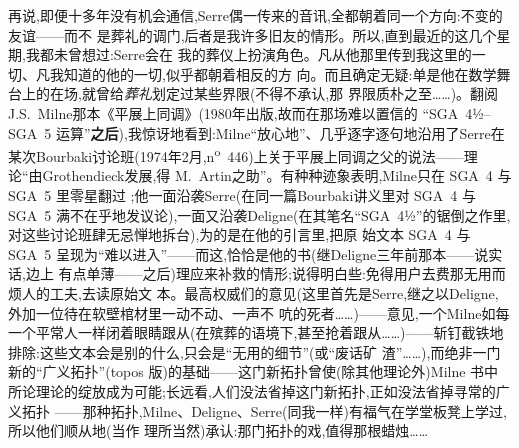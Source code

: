 再说,即便十多年没有机会通信,Serre偶一传来的音讯,全都朝着同一个方向:不变的友谊——而不
是葬礼的调门,后者是我许多旧友的情形。所以,直到最近的这几个星期,我都未曾想过:Serre会在
我的葬仪上扮演角色。凡从他那里传到我这里的一切、凡我知道的他的一切,似乎都朝着相反的方
向。而且确定无疑:单是他在数学舞台上的在场,就曾给\emph{葬礼}划定过某些界限(不得不承认,那
界限质朴之至……)。翻阅 J.S.~Milne那本《平展上同调》(1980年出版,故而在那场难以置信的
“SGA~4½--SGA~5 运算”\textbf{之后}),我惊讶地看到:Milne“放心地”、几乎逐字逐句地沿用了Serre在
某次Bourbaki讨论班(1974年2月,n\textsuperscript{o}~446)上关于平展上同调之父的说法——理论“由Grothendieck发展,\dmark{}得 M.~Artin之助”。有种种迹象表明,Milne只在 SGA~4 与 SGA~5 里零星翻过
;他一面沿袭Serre(在同一篇Bourbaki讲义里对 SGA~4 与 SGA~5 满不在乎地发议论),一面又沿袭Deligne(在其笔名“SGA~4½”的锯倒之作里,对这些讨论班肆无忌惮地拆台),为的是在他的引言里,把原
始文本 SGA~4 与 SGA~5 呈现为“难以进入”——而这,恰恰是他的书(继Deligne三年前那本——说实话,边上
有点单薄——之后)理应来补救的情形;说得明白些:免得用户去费那无用而烦人的工夫,去读原始文
本。最高权威们的意见(这里首先是Serre,继之以Deligne,外加一位待在软壁棺材里一动不动、一声不
吭的死者……)——意见,一个Milne如每一个平常人一样闭着眼睛跟从(在殡葬的语境下,甚至抢着跟从……)——斩钉截铁地排除:这些文本会是别的什么,只会是“无用的细节”(或“废话矿
渣”……),而绝非一门新的“广义拓扑”(topos 版)的基础——这门新拓扑曾使(除其他理论外)Milne
书中所论理论的绽放成为可能;长远看,人们没法省掉这门新拓扑,正如没法省掉寻常的广义拓扑
——那种拓扑,Milne、Deligne、Serre(同我一样)有福气在学堂板凳上学过,所以他们顺从地(当作
理所当然)承认:那门拓扑的戏,值得那根蜡烛……

